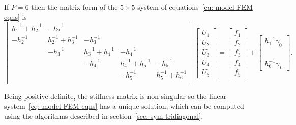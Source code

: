 \begin{example}
If $P=6$ then the matrix form of the $5\times 5$ system of 
equations~\eqref{eq: model FEM eqns} is
\[
\begin{bmatrix}
 h_1^{-1}+h_2^{-1}&        -h_2^{-1}&&&\\
         -h_2^{-1}&h_2^{-1}+h_3^{-1}&-h_3^{-1}&&\\
        &-h_3^{-1}&h_3^{-1}+h_4^{-1}&-h_4^{-1}&\\
       &&-h_4^{-1}&h_4^{-1}+h_5^{-1}&-h_5^{-1}\\
      &&&-h_5^{-1}&h_5^{-1}+h_6^{-1}\\
\end{bmatrix}
\begin{bmatrix}U_1\\ U_2\\ U_3\\ U_4\\ U_5\end{bmatrix}
=\begin{bmatrix}f_1\\ f_2\\ f_3\\ f_4\\ f_5\end{bmatrix}
+\begin{bmatrix}h_1^{-1}\gamma_0\\ \\ \\ \\ h_6^{-1}\gamma_L\end{bmatrix}.
\]
\end{example}

Being positive-definite, the stiffness matrix is non-singular so the linear 
system~\eqref{eq: model FEM eqns} has a unique solution, which can be 
computed using the algorithms described in section~\ref{sec: sym tridiagonal}.


